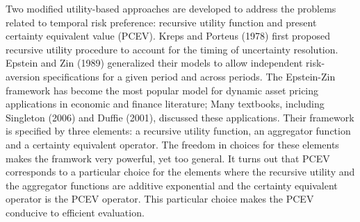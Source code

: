 \documentclass[mnsc,nonblindrev,copyedit]{informs2_wz} %
\newcommand{\OUT}[1]{}
\begin{document}
Two modified utility-based approaches are developed to address the problems related to temporal risk preference: recursive utility function and present certainty equivalent value (PCEV). Kreps and Porteus (1978) first proposed recursive utility procedure to account for the timing of uncertainty resolution. Epstein and Zin (1989) generalized their models to allow independent risk-aversion specifications for a given period and across periods. The Epstein-Zin framework has become the most popular model for dynamic asset pricing applications in economic and finance literature; Many textbooks, including Singleton (2006) and Duffie (2001), discussed these applications. Their framework is specified by three elements: a recursive utility function, an aggregator function and a certainty equivalent operator.    The freedom in choices for these elements makes the framwork very powerful, yet too general. It turns out that PCEV corresponds to a particular choice for the elements where the recursive utility and the aggregator functions are additive exponential and the certainty equivalent operator is the PCEV operator. This particular choice  makes the PCEV conducive to efficient evaluation. 
\OUT{
WHAT ARE WE SAYING HERE?  IS IT A REASON TO USE PCEV, OR SIMPLY SOBEL's METHOD IS BAD?  
While the recursive utility theorem by Epstein and Zin (1989) solves this problem of temporal risk problem, it is not in general consistent with the expected utility preference for consumption. 


Present certainty equivalent value (PCEV) approach captures the decisions maker's risk preference that is sensitive to both uncertainty and the time at which the uncertainty is resolved.
It directly models the decision maker's decisions in both consumption and operations (IS HAT RIGHT???? CANT WE USE PCEV OUTSIDE OF OPERATIONS???).




In our paper, we follow the most popular and most agreed-for discounted utility model and use PCEV to study the firm's decisions, as it captures the decisions maker's risk preference that is sensitive to both uncertainty and the time at which the uncertainty is resolved. (REPETITION WITH THE BEGINNING OF THE PREVIOUS PARAGRAPH)

}
\end{document}

